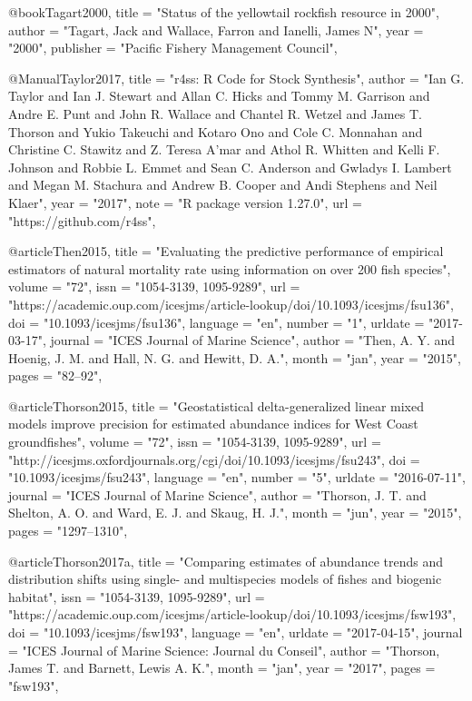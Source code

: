@book{Tagart2000,
    title = "{Status of the yellowtail rockfish resource in 2000}",
    author = "{Tagart, Jack and Wallace, Farron and Ianelli, James N}",
    year = "{2000}",
    publisher = "{Pacific Fishery Management Council}",
}

@Manual{Taylor2017,
    title = "{r4ss: R Code for Stock Synthesis}",
    author = "{Ian G. Taylor and Ian J. Stewart and Allan C. Hicks and Tommy M. Garrison and Andre E. Punt and John R. Wallace and Chantel R. Wetzel and James T. Thorson and Yukio Takeuchi and Kotaro Ono and Cole C. Monnahan and Christine C. Stawitz and Z. Teresa A'mar and Athol R. Whitten and Kelli F. Johnson and Robbie L. Emmet and Sean C. Anderson and Gwladys I. Lambert and Megan M. Stachura and Andrew B. Cooper and Andi Stephens and Neil Klaer}",
    year = "{2017}",
    note = "{R package version 1.27.0}",
    url = "{https://github.com/r4ss}",
}

@article{Then2015,
    title = "{Evaluating the predictive performance of empirical estimators of natural mortality rate using information on over 200 fish species}",
    volume = "{72}",
    issn = "{1054-3139, 1095-9289}",
    url = "{https://academic.oup.com/icesjms/article-lookup/doi/10.1093/icesjms/fsu136}",
    doi = "{10.1093/icesjms/fsu136}",
    language = "{en}",
    number = "{1}",
    urldate = "{2017-03-17}",
    journal = "{ICES Journal of Marine Science}",
    author = "{Then, A. Y. and Hoenig, J. M. and Hall, N. G. and Hewitt, D. A.}",
    month = "jan",
    year = "{2015}",
    pages = "{82--92}",
}

@article{Thorson2015,
    title = "{Geostatistical delta-generalized linear mixed models improve precision for estimated abundance indices for {West} {Coast} groundfishes}",
    volume = "{72}",
    issn = "{1054-3139, 1095-9289}",
    url = "{http://icesjms.oxfordjournals.org/cgi/doi/10.1093/icesjms/fsu243}",
    doi = "{10.1093/icesjms/fsu243}",
    language = "{en}",
    number = "{5}",
    urldate = "{2016-07-11}",
    journal = "{ICES Journal of Marine Science}",
    author = "{Thorson, J. T. and Shelton, A. O. and Ward, E. J. and Skaug, H. J.}",
    month = "jun",
    year = "{2015}",
    pages = "{1297--1310}",
}

@article{Thorson2017a,
    title = "{Comparing estimates of abundance trends and distribution shifts using single- and multispecies models of fishes and biogenic habitat}",
    issn = "{1054-3139, 1095-9289}",
    url = "{https://academic.oup.com/icesjms/article-lookup/doi/10.1093/icesjms/fsw193}",
    doi = "{10.1093/icesjms/fsw193}",
    language = "{en}",
    urldate = "{2017-04-15}",
    journal = "{ICES Journal of Marine Science: Journal du Conseil}",
    author = "{Thorson, James T. and Barnett, Lewis A. K.}",
    month = "jan",
    year = "{2017}",
    pages = "{fsw193}",
}

